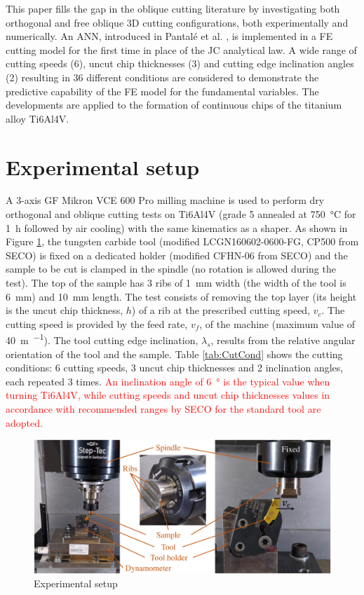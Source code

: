 \documentclass[preprint,12pt,times]{elsarticle}
\begin{document}
This paper fills the gap in the oblique cutting literature by investigating both orthogonal and free oblique 3D cutting configurations, both experimentally and numerically. An ANN, introduced in Pantalé et al. \cite{pantale_Efficient_2022}, is implemented in a FE cutting model for the first time in place of the JC analytical law. A wide range of cutting speeds (6), uncut chip thicknesses (3) and cutting edge inclination angles (2) resulting in 36 different conditions are considered to demonstrate the predictive capability of the FE model for the fundamental variables. The developments are applied to the formation of continuous chips of the titanium alloy Ti6Al4V.

\section{Experimental setup}
\label{ExpSet}

A 3-axis GF Mikron VCE 600 Pro milling machine is used to perform dry orthogonal and oblique cutting tests on Ti6Al4V (grade 5 annealed at \qty{750}{\degreeCelsius} for \qty{1}{\hour} followed by air cooling) with the same kinematics as a shaper. As shown in Figure \ref{fig:ExpSetup}, the tungsten carbide tool (modified LCGN160602-0600-FG, CP500 from SECO) is fixed on a dedicated holder (modified CFHN-06 from SECO) and the sample to be cut is clamped in the spindle (no rotation is allowed during the test). The top of the sample has 3 ribs of \qty{1}{\mm} width (the width of the tool is \qty{6}{\mm}) and \qty{10}{\mm} length. The test consists of removing the top layer (its height is the uncut chip thickness, $h$) of a rib at the prescribed cutting speed, $v_c$. The cutting speed is provided by the feed rate, $v_f$, of the machine (maximum value of \qty{40}{\metre\per\min}). The tool cutting edge inclination, $\lambda_s$, results from the relative angular orientation of the tool and the sample. Table \ref{tab:CutCond} shows the cutting conditions: 6 cutting speeds, 3 uncut chip thicknesses and 2 inclination angles, each repeated 3 times. \textcolor{red}{An inclination angle of \qty{6}{\degree} is the typical value when turning Ti6Al4V, while cutting speeds and uncut chip thicknesses values in accordance with recommended ranges by SECO for the standard tool \cite{secotoolsab_Turning_2011} are adopted.}

\begin{figure}[!h]
\centering
\includegraphics[width = 140 mm]{Figures/ExpSetup} %
\caption{Experimental setup}
\label{fig:ExpSetup}
\end{figure}
\end{document}
